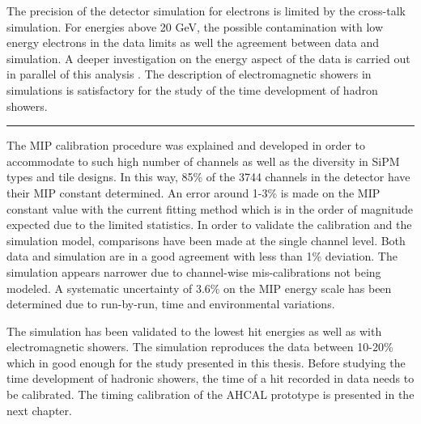 The precision of the detector simulation for electrons is limited by the cross-talk simulation. For energies above 20 GeV, the possible contamination with low energy electrons in the data limits as well the agreement between data and simulation. A deeper investigation on the energy aspect of the data is carried out in parallel of this analysis \cite{AmbraEnergy}. The description of electromagnetic showers in simulations is satisfactory for the study of the time development of hadron showers.

\begin{center}
	\rule{0.5\textwidth}{.4pt}
\end{center}

The MIP calibration procedure was explained and developed in order to accommodate to such high number of channels as well as the diversity in SiPM types and tile designs. In this way, 85\% of the 3744 channels in the detector have their MIP constant determined. An error around 1-3\% is made on the MIP constant value with the current fitting method which is in the order of magnitude expected due to the limited statistics. In order to validate the calibration and the simulation model, comparisons have been made at the single channel level. Both data and simulation are in a good agreement with less than 1\% deviation. The simulation appears narrower due to channel-wise mis-calibrations not being modeled. A systematic uncertainty of 3.6\% on the MIP energy scale has been determined due to run-by-run, time and environmental variations.

The simulation has been validated to the lowest hit energies as well as with electromagnetic showers. The simulation reproduces the data between 10-20\% which in good enough for the study presented in this thesis. Before studying the time development of hadronic showers, the time of a hit recorded in data needs to be calibrated. The timing calibration of the AHCAL prototype is presented in the next chapter.
